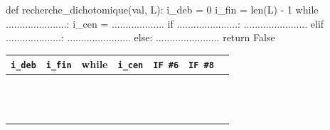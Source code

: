 \begin{exercice_cours}{}

	\begin{minipage}{0.49\linewidth}
		

		\begin{CodePythontexAlt}[TaillePolice=\large, Largeur=1\linewidth,Centre,PremLigne=1]{}
			def recherche_dichotomique(val, L):
				i_deb = 0
				i_fin = len(L) - 1
				while ......................:
					i_cen = ...................
					if ......................:
						.......................
					elif ....................:
						.......................
					else:
						.......................
				return False
			
			\end{CodePythontexAlt}
			
	\end{minipage}\hfill{}
	\begin{minipage}{0.49\linewidth}
		
		\begin{tabular}{|c|c|c|c|c|c|c|}
			\hline
			 \verb+i_deb+ & \verb+i_fin+ & while & \verb+i_cen+ & \verb+IF #6+ & \verb+IF #8+ \\ \hline
			&&&&& \\ \hline
			&&&&& \\ \hline
			&&&&& \\ \hline
			&&&&& \\ \hline
			&&&&& \\ \hline
			&&&&& \\ \hline
			&&&&& \\ \hline
			&&&&& \\ \hline
			&&&&& \\ \hline
			&&&&& \\ \hline
			&&&&& \\ \hline
			&&&&& \\ \hline
			&&&&& \\ \hline
		\end{tabular}
	\end{minipage}



\end{exercice_cours}
